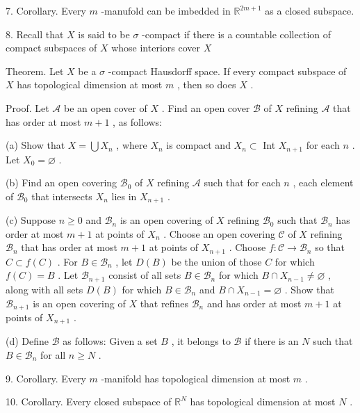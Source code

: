 \documentclass[10pt]{article}
\begin{document}
7. Corollary. Every \(m\) -manufold can be imbedded in \({\mathbb{R}}^{{2m} + 1}\) as a closed subspace.

8. Recall that \(X\) is said to be \(\sigma\) -compact if there is a countable collection of compact subspaces of \(X\) whose interiors cover \(X\)

Theorem. Let \(X\) be a \(\sigma\) -compact Hausdorff space. If every compact subspace of \(X\) has topological dimension at most \(m\) , then so does \(X\) .

Proof. Let \(\mathcal{A}\) be an open cover of \(X\) . Find an open cover \(\mathcal{B}\) of \(X\) refining \(\mathcal{A}\) that has order at most \(m + 1\) , as follows:

(a) Show that \(X = \bigcup {X}_{n}\) , where \({X}_{n}\) is compact and \({X}_{n} \subset\) Int \({X}_{n + 1}\) for each \(n\) . Let \({X}_{0} = \varnothing\) .

(b) Find an open covering \({\mathcal{B}}_{0}\) of \(X\) refining \(\mathcal{A}\) such that for each \(n\) , each element of \({\mathcal{B}}_{0}\) that intersects \({X}_{n}\) lies in \({X}_{n + 1}\) .

(c) Suppose \(n \geq  0\) and \({\mathcal{B}}_{n}\) is an open covering of \(X\) refining \({\mathcal{B}}_{0}\) such that \({\mathcal{B}}_{n}\) has order at most \(m + 1\) at points of \({X}_{n}\) . Choose an open covering \(\mathcal{C}\) of \(X\) refining \({\mathcal{B}}_{n}\) that has order at most \(m + 1\) at points of \({X}_{n + 1}\) . Choose \(f : \mathcal{C} \rightarrow  {\mathcal{B}}_{n}\) so that \(C \subset  f\left( C\right)\) . For \(B \in  {\mathcal{B}}_{n}\) , let \(D\left( B\right)\) be the union of those \(C\) for which \(f\left( C\right)  = B\) . Let \({\mathcal{B}}_{n + 1}\) consist of all sets \(B \in  {\mathcal{B}}_{n}\) for which \(B \cap  {X}_{n - 1} \neq  \varnothing\) , along with all sets \(D\left( B\right)\) for which \(B \in  {\mathcal{B}}_{n}\) and \(B \cap  {X}_{n - 1} = \varnothing\) . Show that \({\mathcal{B}}_{n + 1}\) is an open covering of \(X\) that refines \({\mathcal{B}}_{n}\) and has order at most \(m + 1\) at points of \({X}_{n + 1}\) .

(d) Define \(\mathcal{B}\) as follows: Given a set \(B\) , it belongs to \(\mathcal{B}\) if there is an \(N\) such that \(B \in  {\mathcal{B}}_{n}\) for all \(n \geq  N\) .

9. Corollary. Every \(m\) -manifold has topological dimension at most \(m\) .

10. Corollary. Every closed subspace of \({\mathbb{R}}^{N}\) has topological dimension at most \(N\) .
\end{document}
